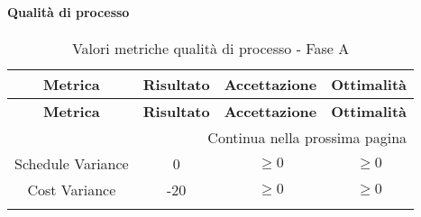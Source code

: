 \paragraph{Qualità di processo}
\begin{longtable}{|c|c|c|c|}
	\hline \multicolumn{1}{|c|}{\textbf{Metrica}} & \multicolumn{1}{c|}{\textbf{Risultato}} & \multicolumn{1}{c|}{\textbf{Accettazione}} & \multicolumn{1}{c|}{\textbf{Ottimalità}} \\ 
	\hline 
	\endfirsthead
	
	\hline \multicolumn{1}{|c|}{\textbf{Metrica}} & \multicolumn{1}{c|}{\textbf{Risultato}} & \multicolumn{1}{c|}{\textbf{Accettazione}} & \multicolumn{1}{c|}{\textbf{Ottimalità}} \\ 
	\hline 
	\endhead
	
	\hline \multicolumn{4}{|r|}{{Continua nella prossima pagina}} \\ 
	\hline
	\endfoot
	
	\hline
	\endlastfoot
	
	\hline Schedule Variance & 0 & $\geq 0$ & $\geq 0$ \\
	\hline Cost Variance & -20 & $\geq 0$ & $\geq 0$ \\
	\hline
	\caption{Valori metriche qualità di processo - Fase A}
\end{longtable}
